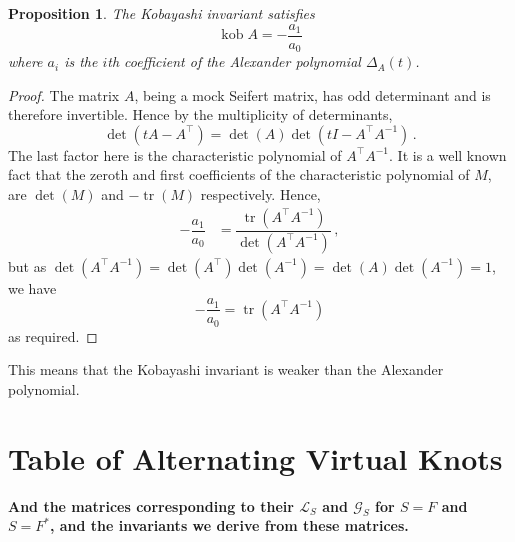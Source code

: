 \documentclass[12pt]{report}
\newcommand{\kob}{\operatorname{kob}}
\newcommand{\notered}[1]{{\color{Red} \textbf{#1}}}
\newtheorem*{proposition}{Proposition}
\theoremstyle{upright}
\begin{document}
\begin{proposition}
The Kobayashi invariant satisfies
\[\kob A = -\dfrac{a_{1}}{a_{0}}\]
where $a_{i}$ is the $i$th coefficient of the Alexander polynomial $\Delta_{A}(t)$.
\end{proposition}
\begin{proof}
The matrix $A$, being a mock Seifert matrix, has odd determinant \cite{mock-seifert-matrices} and is therefore invertible. Hence by the multiplicity of determinants,
\[\det(tA - A^{\top}) = \det(A)\det(tI - A^{\top}A^{-1})\,.\]
The last factor here is the characteristic polynomial of $A^{\top}A^{-1}$. It is a well known fact that the zeroth and first coefficients of the characteristic polynomial of $M$, are $\det(M)$ and $-\operatorname{tr}(M)$ respectively. Hence,
\begin{align*}
-\dfrac{a_{1}}{a_{0}}	& = \dfrac{\operatorname{tr}(A^{\top}A^{-1})}{\det(A^{\top}A^{-1})}\,,
\end{align*}
but as $\det(A^{\top}A^{-1}) = \det(A^{\top})\det(A^{-1}) = \det(A)\det(A^{-1}) = 1$, we have
\[-\dfrac{a_{1}}{a_{0}} = \operatorname{tr}(A^{\top}A^{-1})\]
as required.
\end{proof}

This means that the Kobayashi invariant is weaker than the Alexander polynomial.


\newpage
\printbibliography[title=References]


\appendix
{}
\titlespacing*{\chapter}{0pt}{40pt}{30pt}

\chapter{Table of Alternating Virtual Knots}

\notered{And the matrices corresponding to their $\mathcal{L}_{S}$ and $\mathcal{G}_{S}$ for $S = F$ and $S = F^{*}$, and the invariants we derive from these matrices.}
\end{document}
